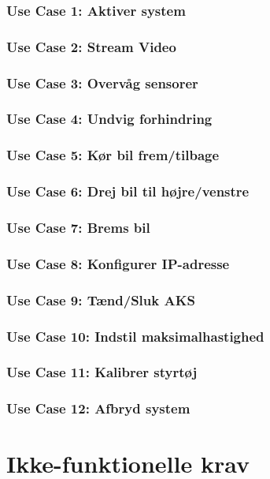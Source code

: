 \subsubsection{Use Case 1: Aktiver system}
\clearpage
\subsubsection{Use Case 2: Stream Video}
\clearpage
\subsubsection{Use Case 3: Overvåg sensorer}
\clearpage
\subsubsection{Use Case 4: Undvig forhindring}
\clearpage
\subsubsection{Use Case 5: Kør bil frem/tilbage}
\clearpage
\subsubsection{Use Case 6: Drej bil til højre/venstre}
\clearpage
\subsubsection{Use Case 7: Brems bil}
\clearpage
\subsubsection{Use Case 8: Konfigurer IP-adresse}
\clearpage
\subsubsection{Use Case 9: Tænd/Sluk AKS}
\clearpage
\subsubsection{Use Case 10: Indstil maksimalhastighed}
\clearpage
\subsubsection{Use Case 11: Kalibrer styrtøj}
\clearpage
\subsubsection{Use Case 12: Afbryd system}

\clearpage

\section{Ikke-funktionelle krav}

\clearpage